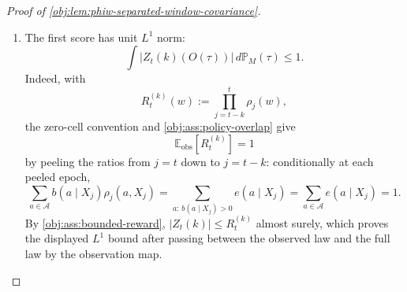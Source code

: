 \begin{proof}[Proof of \cref{obj:lem:phiw-separated-window-covariance}]
\begin{enumerate}
Also, by definition of \(\mathbb P_M^{\mathrm{obs}}\),
\[
\int Z_t(k)(w)\,d\mathbb P_M^{\mathrm{obs}}(w)
=
\int Z_t(k)(O(\tau))\,d\mathbb P_M(\tau).
\]
Thus the covariance equals the centered full-law product
\[
\operatorname{Cov}_{\mathrm{obs}}(Z_t(k),Z_u(k))
=
\int Z_t(k)(O(\tau))\,\Phi_{\gamma,k}(S_{t+1}(\tau))\,d\mathbb P_M(\tau)
-
\Bigl(\int Z_t(k)(O(\tau))\,d\mathbb P_M(\tau)\Bigr)
\Bigl(\int \Phi_{\gamma,k}(S_{t+1}(\tau))\,d\mathbb P_M(\tau)\Bigr).
\]
The covariance identity is legitimate because
\[
Z_t(k),Z_u(k)\in L^2(\mathbb P_M^{\mathrm{obs}}).
\]
Indeed, write the window product in \(Z_m(k)\) as
\[
R_m^{(k)}(w):=\prod_{\substack{j\in\{0,\ldots,T-1\}:\, j\le m,\ m-j\le k}}
\rho_j(w),
\qquad m\in\{t,u\}.
\]
The product contains at most \(k+1\) factors. The zero-cell convention and \cref{obj:ass:policy-overlap} make each factor nonnegative and at most \(L\) on observed behavior-support cells, while \cref{obj:ass:bounded-reward} gives \(|Y_m|\le 1\) almost surely. Hence \(|Z_m(k)|\le L^{k+1}\) almost surely under \(\mathbb P_M^{\mathrm{obs}}\), and the two scores are square-integrable. %

\item The first score has unit \(L^1\) norm:
\[
\int |Z_t(k)(O(\tau))|\,d\mathbb P_M(\tau)\le 1 .
\]
Indeed, with
\[
R_t^{(k)}(w):=\prod_{j=t-k}^{t}\rho_j(w),
\]
the zero-cell convention and \cref{obj:ass:policy-overlap} give
\[
\mathbb E_{\mathrm{obs}}\!\left[R_t^{(k)}\right]=1
\]
by peeling the ratios from \(j=t\) down to \(j=t-k\): conditionally at each peeled epoch,
\[
\sum_{a\in\mathcal A} b(a\mid X_j)\rho_j(a,X_j)
=
\sum_{a:\,b(a\mid X_j)>0} e(a\mid X_j)
=
\sum_{a\in\mathcal A} e(a\mid X_j)
=1 .
\]
By \cref{obj:ass:bounded-reward}, \(|Z_t(k)|\le R_t^{(k)}\) almost surely, which proves the displayed \(L^1\) bound after passing between the observed law and the full law by the observation map. %


\end{enumerate}
\end{proof}
